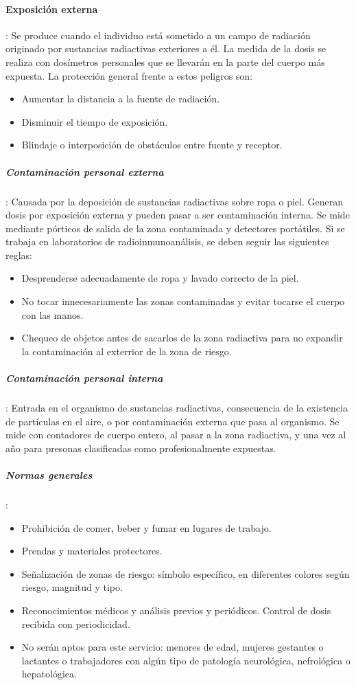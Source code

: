 \paragraph{Exposición externa}: Se produce cuando el individuo está sometido a un campo de radiación originado por sustancias radiactivas exteriores a él. La medida de la dosis se realiza con dosímetros personales que se llevarán en la parte del cuerpo más expuesta. La protección general frente a estos peligros son:
    \begin{itemize}[itemsep=0pt,parsep=0pt,topsep=0pt,partopsep=0pt]
        \item Aumentar la distancia a la fuente de radiación.
        \item Disminuir el tiempo de exposición.
        \item Blindaje o interposición de obstáculos entre fuente y receptor.
    \end{itemize}
    \subparagraph{Contaminación personal externa}: Causada por la deposición de sustancias radiactivas sobre ropa o piel. Generan dosis por exposición externa y pueden pasar a ser contaminación interna. Se mide mediante pórticos de salida de la zona contaminada y detectores portátiles. Si se trabaja en laboratorios de radioinmunoanálisis, se deben seguir las siguientes reglas:
        \begin{itemize}[itemsep=0pt,parsep=0pt,topsep=0pt,partopsep=0pt]
            \item Desprenderse adecuadamente de ropa y lavado correcto de la piel.
            \item No tocar innecesariamente las zonas contaminadas y evitar tocarse el cuerpo con las manos.
            \item Chequeo de objetos antes de sacarlos de la zona radiactiva para no expandir la contaminación al exterrior de la zona de riesgo.
        \end{itemize}
    \subparagraph{Contaminación personal interna}: Entrada en el organismo de sustancias radiactivas, consecuencia de la existencia de partículas en el aire, o por contaminación externa que pasa al organismo. Se mide con contadores de cuerpo entero, al pasar a la zona radiactiva, y una vez al año para presonas clasificadas como profesionalmente expuestas.
    \subparagraph{Normas generales}:
    \begin{itemize}[itemsep=0pt,parsep=0pt,topsep=0pt,partopsep=0pt]
        \item Prohibición de comer, beber y fumar en lugares de trabajo.
        \item Prendas y materiales protectores.
        \item Señalización de zonas de riesgo: símbolo específico, en diferentes colores según riesgo, magnitud y tipo.
        \item Reconocimientos médicos y análisis previos y periódicos. Control de dosis recibida con periodicidad.
        \item No serán aptos para este servicio: menores de edad, mujeres gestantes o lactantes o trabajadores con algún tipo de patología neurológica, nefrológica o hepatológica.
    \end{itemize}
